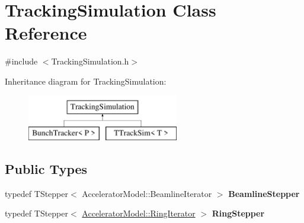 \hypertarget{classTrackingSimulation}{}\section{Tracking\+Simulation Class Reference}
\label{classTrackingSimulation}


{\ttfamily \#include $<$Tracking\+Simulation.\+h$>$}

Inheritance diagram for Tracking\+Simulation\+:\begin{figure}[H]
\begin{center}
\leavevmode
\includegraphics[height=2.000000cm]{classTrackingSimulation}
\end{center}
\end{figure}
\subsection*{Public Types}
\begin{DoxyCompactItemize}
\item 
\mbox{\label{classTrackingSimulation_a67244bc98b227fb1c2070676f6c756be}} 
typedef T\+Stepper$<$ Accelerator\+Model\+::\+Beamline\+Iterator $>$ {\bfseries Beamline\+Stepper}
\item 
\mbox{\label{classTrackingSimulation_a1a3a7c3290939897054b0ebbad8f58bd}} 
typedef T\+Stepper$<$ \hyperlink{classring__iterator}{Accelerator\+Model\+::\+Ring\+Iterator} $>$ {\bfseries Ring\+Stepper}
\end{DoxyCompactItemize}

